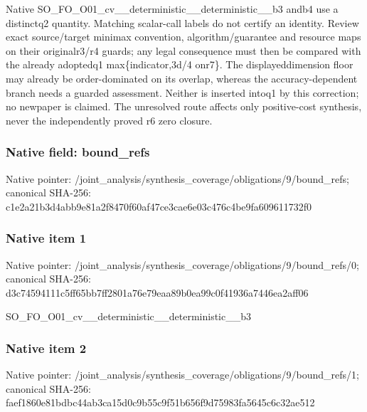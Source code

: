 \documentclass[10pt,a4paper]{article}
\begin{document}
\begingroup\raggedright\sloppy Native SO\_\allowbreak{}FO\_\allowbreak{}O01\_\allowbreak{}cv\_\allowbreak{}\_\allowbreak{}deterministic\_\allowbreak{}\_\allowbreak{}deterministic\_\allowbreak{}\_\allowbreak{}b3 andb4 use a distinctq2 quantity. Matching scalar-call labels do not certify an identity. Review exact source/\allowbreak{}target minimax convention,\allowbreak{} algorithm/\allowbreak{}guarantee and resource maps on their originalr3/\allowbreak{}r4 guards;\allowbreak{} any legal consequence must then be compared with the already adoptedq1 max\{indicator,\allowbreak{}3d/\allowbreak{}4 onr7\}. The displayeddimension floor may already be order-dominated on its overlap,\allowbreak{} whereas the accuracy-dependent branch needs a guarded assessment. Neither is inserted intoq1 by this correction;\allowbreak{} no newpaper is claimed. The unresolved route affects only positive-cost synthesis,\allowbreak{} never the independently proved r6 zero closure.\par\endgroup

\subsubsection{Native field: bound\_\allowbreak{}refs}
Native pointer: /joint\_\allowbreak{}analysis/synthesis\_\allowbreak{}coverage/obligations/9/bound\_\allowbreak{}refs; canonical SHA-256: c1e2a21b3d4abb9e81a2f8470f60af47ce3cae6e03c476c4be9fa609611732f0

\subsubsection{Native item 1}
Native pointer: /joint\_\allowbreak{}analysis/synthesis\_\allowbreak{}coverage/obligations/9/bound\_\allowbreak{}refs/0; canonical SHA-256: d3c74594111c5ff65bb7ff2801a76e79eaa89b0ea99c0f41936a7446ea2aff06

\begingroup\raggedright\sloppy SO\_\allowbreak{}FO\_\allowbreak{}O01\_\allowbreak{}cv\_\allowbreak{}\_\allowbreak{}deterministic\_\allowbreak{}\_\allowbreak{}deterministic\_\allowbreak{}\_\allowbreak{}b3\par\endgroup

\subsubsection{Native item 2}
Native pointer: /joint\_\allowbreak{}analysis/synthesis\_\allowbreak{}coverage/obligations/9/bound\_\allowbreak{}refs/1; canonical SHA-256: faef1860e81bdbc44ab3ca15d0c9b55c9f51b656f9d75983fa5645c6c32ae512
\end{document}
